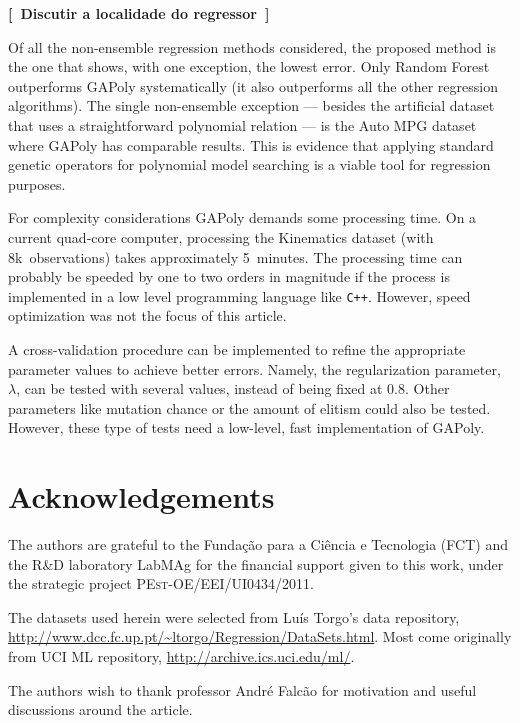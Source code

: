 \documentclass[preprint,authoryear,12pt]{elsarticle}
\newcommand{\note}[1]{\textbf{[~#1~]}}
\begin{document}
\note{Discutir a localidade do regressor}

Of all the non-ensemble regression methods considered, the proposed method is the one that shows, with one exception, the lowest error. Only Random Forest outperforms \ac{GAPoly} systematically (it also outperforms all the other regression algorithms). The single non-ensemble exception --- besides the artificial dataset that uses a straightforward polynomial relation --- is the Auto MPG dataset where \ac{GAPoly} has comparable results. This is evidence that applying standard genetic operators for polynomial model searching is a viable tool for regression purposes.

For complexity considerations \ac{GAPoly} demands some processing time. On a current quad-core computer, processing the Kinematics dataset (with 8k~observations) takes approximately 5~minutes. The processing time can probably be speeded by one to two orders in magnitude if the process is implemented in a low level programming language like \texttt{C++}. However, speed optimization was not the focus of this article.

A cross-validation procedure can be implemented to refine the appropriate parameter values to achieve better errors. Namely, the regularization parameter, $\lambda$, can be tested with several values, instead of being fixed at $0.8$. Other parameters like mutation chance or the amount of elitism could also be tested. However, these type of tests need a low-level, fast implementation of \ac{GAPoly}.

\section*{Acknowledgements}

The authors are grateful to the Fundação para a Ciência e Tecnologia (FCT) and the  R\&D laboratory LabMAg for the financial support given to this work, under the strategic project \textsc{PEst-OE/EEI/UI0434/2011}.

The datasets used herein were selected from Luís Torgo's data  repository, \url{http://www.dcc.fc.up.pt/~ltorgo/Regression/DataSets.html}. Most come originally from UCI ML repository, \url{http://archive.ics.uci.edu/ml/}.

The authors wish to thank professor André Falcão for motivation and useful discussions around the article.




    
\end{document}
